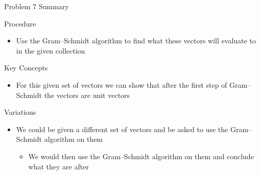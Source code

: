 \begin{summary}{Problem 7 Summary}
    \begin{statement}{Procedure}
        \begin{itemize}
            \item Use the Gram–Schmidt algorithm to find what these vectors will evaluate to in the given collection
        \end{itemize}
    \end{statement}
    \begin{statement}{Key Concepts}
        \begin{itemize}
            \item For this given set of vectors we can show that after the first step of Gram–Schmidt the vectors are unit vectors
        \end{itemize}
    \end{statement}
    \begin{statement}{Variations}
        \begin{itemize}
            \item We could be given a different set of vectors and be asked to use the Gram–Schmidt algorithm on them
            \begin{itemize}
                \item We would then use the Gram–Schmidt algorithm on them and conclude what they are after
            \end{itemize}
        \end{itemize}
    \end{statement}
\end{summary}